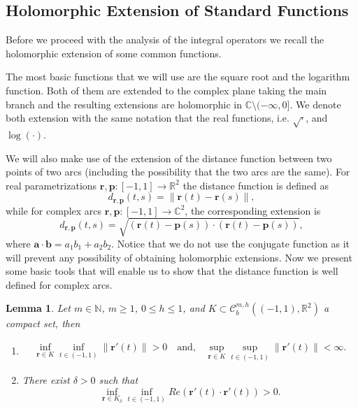 \documentclass{article}
\newtheorem{lemma}[theorem]{Lemma}
\newcommand{\ba} {\bm a}
\newcommand{\IC}{{\mathbb C}}
\newcommand{\IN}{{\mathbb N}}
\newcommand{\IR}{{\mathbb R}}
\newcommand{\bp}{{\bm p}}
\newcommand{\rgeoh}[2]{\mathcal{C}_b^{#1,#2}\left( (-1,1), \IR^2 \right)}
\newcommand{\br}{\bm{r}}
\newcommand{\bb}{\bm{b}}
\begin{document}
\subsection{Holomorphic Extension of Standard Functions}
Before we proceed with the analysis of the integral operators we recall the holomorphic extension of some common functions.

The most basic functions that we will use are the square root and the logarithm function. Both of them are extended to the complex plane taking the main branch and the resulting extensions are holomorphic in $\IC \setminus (-\infty,0]$. We denote both extension with the same notation that the real functions, i.e. $\sqrt{\cdot}$, and $\log{(\cdot)}$.   

We will also make use of the extension of the distance function between two points of two arcs (including the possibility that the two arcs are the same).  For real parametrizations $\br, \bp :[-1,1] \rightarrow \IR^2$ the distance function is defined as 
$$d_{\br,\bp}(t,s) = \| \br(t) - \br(s)\|,$$
while for complex arcs $\br, \bp :[-1,1] \rightarrow \IC^2$, the corresponding extension is 
$$d_{\br,\bp}(t,s) =  \sqrt{(\br(t)-\bp(s))\cdot (\br(t)-\bp(s))},$$
where $\ba \cdot \bb  = a_1 b_1 + a_2 b_2$. Notice that we do not use the conjugate function as it will prevent any possibility of obtaining holomorphic extensions.  Now we present some basic tools that will enable us to show that the distance function is well defined for complex arcs. 
\begin{lemma}
\label{lemma:dwelldef}
Let $m \in \IN$, $m\geq1$, $0\leq h \leq 1$, and $K \subset \rgeoh{m}{h}$ a compact set, then 
\begin{enumerate}
\item 
\begin{align*}
\inf_{\br \in K } \inf_{t \in (-1,1)} \| \br'(t) \|>0  \quad \text{and,} \quad  \sup_{\br \in K} \sup_{t \in (-1,1)} \| \br'(t)\| < \infty.
\end{align*}
\item 
There exist $\delta >0 $ such that  
$$ 
\inf_{\br \in K_\delta} \inf_{t \in (-1,1)}Re (\br'(t) \cdot \br'(t)) > 0 .$$
\end{enumerate}
\end{lemma}
\end{document}
